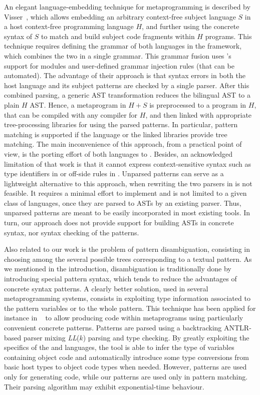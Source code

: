 An elegant language\hyp{}embedding technique for meta\-programming is
described by Visser~\cite{metaprog}, which allows embedding an
arbitrary context\hyp{}free subject language \(S\) in a host
context\hyp{}free programming language \(H\), and further using the
concrete syntax of \(S\) to match and build subject code fragments
within \(H\) programs. This technique requires defining the grammar of
both languages in the \SDF framework, which combines the two in a
single grammar. This grammar fusion uses \SDF's support for modules
and user\hyp{}defined grammar injection rules (that can be
automated). The advantage of their approach is that syntax errors in
both the host language and its subject patterns are checked by a
single parser. After this combined parsing, a generic AST
transformation reduces the bilingual AST to a plain \(H\) AST. Hence,
a meta\-program in \(H+S\) is preprocessed to a program in \(H\), that
can be compiled with any compiler for \(H\), and then linked with
appropriate tree\hyp{}processing libraries for using the parsed
patterns. In particular, pattern matching is supported if the language
or the linked libraries provide tree matching. The main inconvenience
of this approach, from a practical point of view, is the porting
effort of both languages to \SDF. Besides, an acknowledged limitation
of that work is that it cannot express context\hyp{}sensitive syntax
such as type identifiers in \Clang or off\hyp{}side rules in
\Haskell. Unparsed patterns can serve as a lightweight alternative to
this approach, when re\-writing the two parsers in \SDF is not
feasible. It requires a minimal effort to implement and is not limited
to a given class of languages, once they are parsed to ASTs by an
existing parser. Thus, unparsed patterns are meant to be easily
incorporated in most existing tools. In turn, our approach does not
provide support for building ASTs in concrete syntax, nor syntax
checking of the patterns.

Also related to our work is the problem of pattern disambiguation,
consisting in choosing among the several possible trees corresponding
to a textual pattern. As we mentioned in the introduction,
disambiguation is traditionally done by introducing special pattern
syntax, which tends to reduce the advantages of concrete syntax
patterns. A clearly better solution, used in several meta\-programming
systems, consists in exploiting type information associated to the
pattern variables or to the whole pattern. This technique has been
applied for instance in \MetaAspectJ~\cite{maj} to allow producing
\AspectJ code within \Java meta\-programs using particularly
convenient concrete patterns. Patterns are parsed using a backtracking
\textsf{ANTLR}\hyp{}based parser mixing \textit{LL}(\(k\)) parsing and
type checking. By greatly exploiting the specifics of the \Java and
\AspectJ languages, the tool is able to infer the type of variables
containing object code and automatically introduce some type
conversions from basic host types to object code types when
needed. However, patterns are used only for generating code, while our
patterns are used only in pattern matching. Their parsing algorithm
may exhibit exponential\hyp{}time behaviour.

